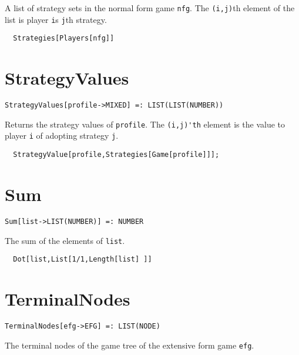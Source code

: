 \noindent
A list of strategy sets in the normal form game \verb+nfg+. The
\verb+(i,j)+th element of the list is player \verb+i+s \verb+j+th
strategy.  

\udfbody
\begin{verbatim}
  Strategies[Players[nfg]]
\end{verbatim} 


\section*{StrategyValues}\label{ExtStrategyValues}
\begin{verbatim}
StrategyValues[profile->MIXED] =: LIST(LIST(NUMBER)) 
\end{verbatim}

\noindent
Returns the strategy values of \verb+profile+.  The
\verb+(i,j)'th+ element is the value to player \verb+i+ of adopting
strategy \verb+j+.

\udfbody 
\begin{verbatim}
  StrategyValue[profile,Strategies[Game[profile]]];
\end{verbatim} 


\section*{Sum}\label{ExtSum}
\begin{verbatim}
Sum[list->LIST(NUMBER)] =: NUMBER 
\end{verbatim}

\noindent
The sum of the elements of \verb+list+.  

\udfbody
\begin{verbatim}
  Dot[list,List[1/1,Length[list] ]]
\end{verbatim} 


\section*{TerminalNodes}\label{ExtTerminalNodes}
\begin{verbatim}
TerminalNodes[efg->EFG] =: LIST(NODE) 
\end{verbatim}

\noindent
The terminal nodes of the game tree of the extensive form game \verb+efg+.

